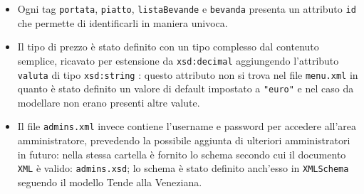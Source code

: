 \documentclass[../relazione.tex]{subfiles}
\begin{document}
\begin{itemize}
		\item Ogni tag \texttt{portata}, \texttt{piatto}, \texttt{listaBevande} e \texttt{bevanda} presenta un attributo \texttt{id} che permette di identificarli in maniera univoca.
		\item Il tipo di prezzo è stato definito con un tipo complesso dal contenuto semplice, ricavato per estensione da \texttt{xsd:decimal} aggiungendo l'attributo \texttt{valuta} di tipo \texttt{xsd:string} : questo attributo non si trova nel file \texttt{menu.xml} in quanto è stato definito un valore di default impostato a \texttt{"euro"} e nel caso da modellare non erano presenti altre valute.
		\item Il file \texttt{admins.xml} invece contiene l’username e password per accedere all’area amministratore, prevedendo la possibile aggiunta di ulteriori amministratori in futuro: nella stessa cartella è fornito lo schema secondo cui il documento \texttt{XML} è valido: \texttt{admins.xsd}; lo schema è stato definito anch'esso in \texttt{XMLSchema} seguendo il modello Tende alla Veneziana.
	\end{itemize}
\end{document}
